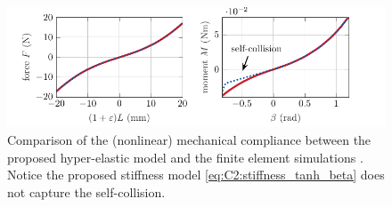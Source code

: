 
\begin{figure}[!t]
  \vspace{-1mm}
   \hspace{-2mm}
   \includegraphics*{./pdf/thesis-figure-4-8.pdf}
   \vspace{-0.5cm}
   \caption{Comparison of the (nonlinear) mechanical compliance between the proposed hyper-elastic model  and the finite element simulations . Notice the proposed stiffness model \eqref{eq:C2:stiffness_tanh_beta} does not capture the self-collision. }
   \vspace{-0.1cm}
   \label{fig:C2:fem_stiffness_recover_compare}
 \end{figure}
 
